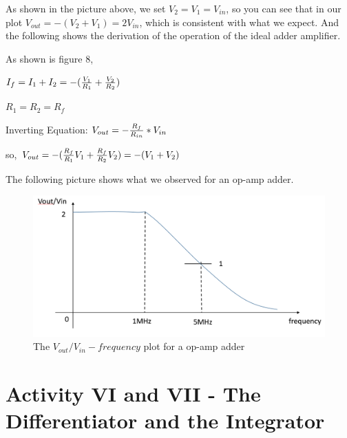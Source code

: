 \documentclass[11pt]{article}
\begin{document}
As shown in the picture above, we set $V_{2}=V_{1}=V_{in}$, so you can see that in our plot $V_{out}=-(V_{2}+V_{1})=2V_{in}$, which is consistent with what we expect. And the following shows the derivation of the operation of the ideal adder amplifier.

As shown is figure 8,

$I_{f}=I_{1}+I_{2}=-({V_{1}\over R_{1}}+{V_{2}\over R_{2}})$

$R_{1}=R_{2}=R_{f}$

Inverting Equation: $V_{out}=-{R_{f}\over R_{in}}*V_{in}$

so, $V_{out}=-({R_{f}\over R_{1}}V_{1}+{R_{f}\over R_{2}}V_{2})=-(V_{1}+V_{2})$

The following picture shows what we observed for an op-amp adder.

\begin{figure}[H]
 \begin{center}
  \includegraphics[width=\linewidth/2]{act5}
  \caption{The $V_{out}/V_{in} - frequency$ plot for a op-amp adder}
  \label{fig:act5}
 \end{center}
\end{figure}

\section{Activity VI and VII - The Differentiator and the Integrator}
\end{document}
